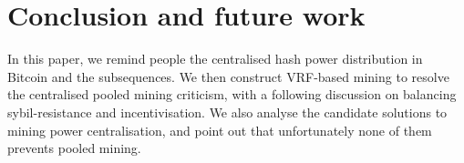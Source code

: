 \section{Conclusion and future work}



In this paper, we remind people the centralised hash power distribution in Bitcoin and the subsequences.
We then construct VRF-based mining to resolve the centralised pooled mining criticism,
with a following discussion on balancing sybil-resistance and incentivisation.
We also analyse the candidate solutions to mining power centralisation, and point out that unfortunately none of them prevents pooled mining.